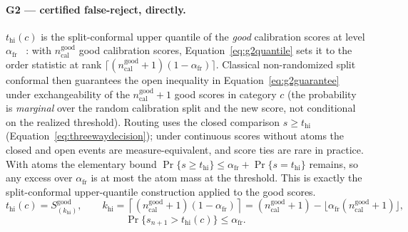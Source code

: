 \documentclass[preprint,11pt]{elsarticle}
\begin{document}
\paragraph{G2 --- certified false-reject, directly.} $t_{\text{hi}}(c)$ is the split-conformal
upper quantile of the \emph{good} calibration scores at level $\alpha_{\text{fr}}$
~\citep{papadopoulos2002inductive,vovk2005algorithmic}: with
$n_{\text{cal}}^{\text{good}}$ good calibration scores, Equation~\eqref{eq:g2quantile} sets it to
the order statistic at rank
$\lceil (n_{\text{cal}}^{\text{good}}+1)(1-\alpha_{\text{fr}}) \rceil$. Classical
non-randomized split conformal then guarantees the open inequality in
Equation~\eqref{eq:g2guarantee} under exchangeability of the $n_{\text{cal}}^{\text{good}}+1$
good scores in category $c$ (the probability is \emph{marginal} over the random calibration
split and the new score, not conditional on the realized threshold). Routing uses the closed
comparison $s \ge t_{\text{hi}}$ (Equation~\eqref{eq:threewaydecision}); under continuous scores
without atoms the closed and open events are measure-equivalent, and score ties are rare in
practice. With atoms the elementary bound
$\Pr\{s\ge t_{\text{hi}}\}\le\alpha_{\text{fr}}+\Pr\{s=t_{\text{hi}}\}$
remains, so any excess over $\alpha_{\text{fr}}$ is at most the atom mass at the threshold.
This is exactly the split-conformal upper-quantile construction applied to the good
scores.
\begin{equation}
t_{\text{hi}}(c)=S^{\text{good}}_{(k_{\text{hi}})},\qquad
k_{\text{hi}}=\left\lceil (n_{\text{cal}}^{\text{good}}+1)
(1-\alpha_{\text{fr}})\right\rceil
=(n_{\text{cal}}^{\text{good}}+1)
-\bigl\lfloor\alpha_{\text{fr}}(n_{\text{cal}}^{\text{good}}+1)\bigr\rfloor ,
\label{eq:g2quantile}
\end{equation}
\begin{equation}
\Pr\!\bigl\{s_{n+1} > t_{\text{hi}}(c)\bigr\}
\le \alpha_{\text{fr}}.
\label{eq:g2guarantee}
\end{equation}
\end{document}
